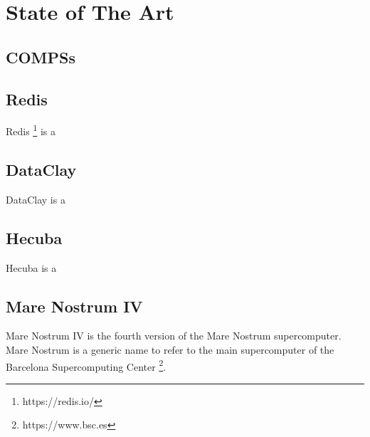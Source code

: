\section{State of The Art}
\label{sec:state_of_the_art}

\subsection{COMPSs}
\label{subsec:compss_state_of_the_art}


\subsection{Redis}
\label{subsec:redis_state_of_the_art}
Redis \footnote{https://redis.io/} is a 

\subsection{DataClay}
\label{subsec:dataclay_state_of_the_art}
DataClay \cite{DataClay} is a 

\subsection{Hecuba}
\label{subsec:hecuba_state_of_the_art}
Hecuba \cite{alomar2015hecuba} is a 

\subsection{Mare Nostrum IV}
\label{subsec:mare_nostrum}
Mare Nostrum IV is the fourth version of the Mare Nostrum supercomputer. Mare Nostrum is a generic name to refer to the main supercomputer of the Barcelona Supercomputing Center \footnote{https://www.bsc.es}.

